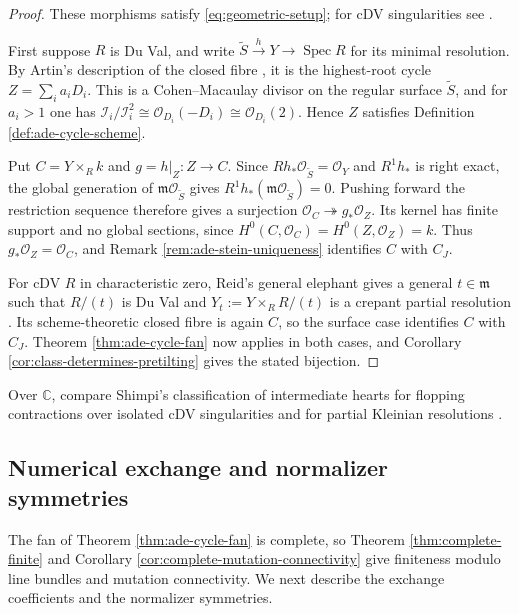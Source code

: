 \documentclass[a4paper,reqno]{amsart}
\def\I{\mathcal{I}}
\def\O{\mathcal{O}}
\def\m{\mathfrak{m}}
\DeclareMathOperator{\Spec}{Spec}
\theoremstyle{definition}
\begin{document}
\begin{proof}
These morphisms satisfy \eqref{eq:geometric-setup}; for cDV singularities see \cite[Sections 1.2 and 2.2]{Wem23survey}.

First suppose $R$ is Du Val, and write $\widetilde S\xrightarrow{h}Y\to\Spec R$ for its minimal resolution. By Artin's description of the closed fibre \cite{Art66}, it is the highest-root cycle $Z=\sum_i a_iD_i$. This is a Cohen--Macaulay divisor on the regular surface $\widetilde S$, and for $a_i>1$ one has $\I_i/\I_i^2\cong\O_{D_i}(-D_i)\cong\O_{D_i}(2)$. Hence $Z$ satisfies Definition \ref{def:ade-cycle-scheme}.

Put $C=Y\times_Rk$ and $g=h|_Z\colon Z\to C$. Since $Rh_*\O_{\widetilde S}=\O_Y$ and $R^1h_*$ is right exact, the global generation of $\m\O_{\widetilde S}$ gives $R^1h_*(\m\O_{\widetilde S})=0$. Pushing forward the restriction sequence therefore gives a surjection $\O_C\twoheadrightarrow g_*\O_Z$. Its kernel has finite support and no global sections, since $H^0(C,\O_C)=H^0(Z,\O_Z)=k$. Thus $g_*\O_Z=\O_C$, and Remark \ref{rem:ade-stein-uniqueness} identifies $C$ with $C_J$.

For cDV $R$ in characteristic zero, Reid's general elephant gives a general $t\in\m$ such that $R/(t)$ is Du Val and $Y_t:=Y\times_R R/(t)$ is a crepant partial resolution \cite[Theorem 1.14]{Rei83}. Its scheme-theoretic closed fibre is again $C$, so the surface case identifies $C$ with $C_J$. Theorem \ref{thm:ade-cycle-fan} now applies in both cases, and Corollary \ref{cor:class-determines-pretilting} gives the stated bijection.
\end{proof}

Over $\mathbb C$, compare Shimpi's classification of intermediate hearts for flopping contractions over isolated cDV singularities and for partial Kleinian resolutions \cite[Theorem 4.6 and the Introduction]{Shi26}.

\subsection{Numerical exchange and normalizer symmetries}\label{sec:ade-mutation-symmetries}

The fan of Theorem \ref{thm:ade-cycle-fan} is complete, so Theorem \ref{thm:complete-finite} and Corollary \ref{cor:complete-mutation-connectivity} give finiteness modulo line bundles and mutation connectivity. We next describe the exchange coefficients and the normalizer symmetries.
\end{document}

